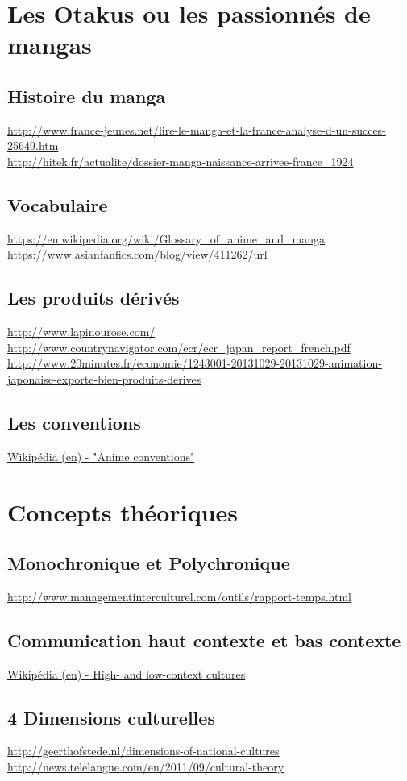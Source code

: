 \section{Les Otakus ou les passionnés de mangas}

\subsection{Histoire du manga}
\noindent
\url{http://www.france-jeunes.net/lire-le-manga-et-la-france-analyse-d-un-succes-25649.htm}\\
\url{http://hitek.fr/actualite/dossier-manga-naissance-arrivee-france_1924}

\subsection{Vocabulaire}
\noindent
\url{https://en.wikipedia.org/wiki/Glossary_of_anime_and_manga}\\
\url{https://www.asianfanfics.com/blog/view/411262/url}

\subsection{Les produits dérivés}
\noindent
\url{http://www.lapinourose.com/}\\
\url{http://www.countrynavigator.com/ecr/ecr_japan_report_french.pdf}\\
\url{http://www.20minutes.fr/economie/1243001-20131029-20131029-animation-japonaise-exporte-bien-produits-derives}

\subsection{Les conventions}
\noindent
\url{Wikipédia (en) - "Anime conventions"}\\

\section{Concepts théoriques}

\subsection{Monochronique et Polychronique}
\noindent
\url{http://www.managementinterculturel.com/outils/rapport-temps.html}\\

\subsection{Communication haut contexte et bas contexte}
\noindent
\url{Wikipédia (en) - High- and low-context cultures}\\

\subsection{4 Dimensions culturelles}
\noindent
\url{http://geerthofstede.nl/dimensions-of-national-cultures}\\
\url{http://news.telelangue.com/en/2011/09/cultural-theory}
